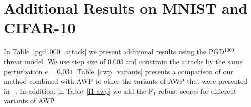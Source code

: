 \section{Additional Results on MNIST and CIFAR-10} \label{additional_res}
In Table~\ref{pgd1000_attack} we present additional results using the PGD$^{1000}$ threat model. We use step size of 0.003 and constrain the attacks by the same perturbation $\epsilon=0.031$. Table~\ref{awp_variants} presents a comparison of our method combined with AWP to other the variants of AWP that were presented in ~\cite{wu2020adversarial}. In addition, in Table~\ref{f1-awp} we add the F$_{1}$-robust scores for different variants of AWP.


